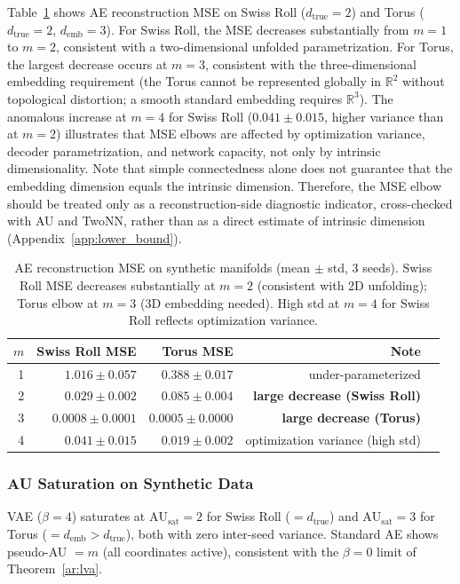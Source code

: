 \documentclass[make,article,submit,pdftex,moreauthors]{Definitions/mdpi}
\newcommand{\dtrue}{d_{\mathrm{true}}}
\newcommand{\AUsat}{\mathrm{AU}_{\mathrm{sat}}}
\newcommand{\demb}{d_{\mathrm{emb}}}
\newcommand{\R}{\mathbb{R}}
\begin{document}
Table~\ref{tab:e1} shows AE reconstruction MSE on Swiss Roll
($\dtrue = 2$) and Torus ($\dtrue = 2$, $\demb = 3$).
For Swiss Roll, the MSE decreases substantially from $m = 1$ to $m = 2$,
consistent with a two-dimensional unfolded parametrization.
For Torus, the largest decrease occurs at $m = 3$, consistent with the
three-dimensional embedding requirement (the Torus cannot be represented
globally in $\R^2$ without topological distortion; a smooth standard
embedding requires $\R^3$).
The anomalous increase at $m = 4$ for Swiss Roll ($0.041 \pm 0.015$,
higher variance than at $m = 2$) illustrates that MSE elbows are affected
by optimization variance, decoder parametrization, and network capacity,
not only by intrinsic dimensionality.
Note that simple connectedness alone does not guarantee that the embedding
dimension equals the intrinsic dimension.
Therefore, the MSE elbow should be treated only as a reconstruction-side
diagnostic indicator, cross-checked with AU and TwoNN, rather than as a
direct estimate of intrinsic dimension (Appendix~\ref{app:lower_bound}).

\begin{table}[H]
\caption{AE reconstruction MSE on synthetic manifolds (mean $\pm$ std,
3 seeds). Swiss Roll MSE decreases substantially at $m = 2$ (consistent
with 2D unfolding); Torus elbow at $m = 3$ (3D embedding needed).
High std at $m = 4$ for Swiss Roll reflects optimization variance.}
\label{tab:e1}
\small
\begin{tabular}{rrrrl}
\toprule
$m$ & \textbf{Swiss Roll MSE} & \textbf{Torus MSE} & Note \\
\midrule
1 & $1.016 \pm 0.057$ & $0.388 \pm 0.017$ & under-parameterized \\
2 & $\mathbf{0.029 \pm 0.002}$ & $0.085 \pm 0.004$ &
  \textbf{large decrease (Swiss Roll)} \\
3 & $0.0008 \pm 0.0001$ & $\mathbf{0.0005 \pm 0.0000}$ &
  \textbf{large decrease (Torus)} \\
4 & $0.041 \pm 0.015$ & $0.019 \pm 0.002$ &
  optimization variance (high std) \\
\bottomrule
\end{tabular}
\end{table}

\subsubsection{AU Saturation on Synthetic Data}

VAE ($\beta = 4$) saturates at $\AUsat = 2$ for Swiss Roll
($= \dtrue$) and $\AUsat = 3$ for Torus ($= \demb > \dtrue$), both with
zero inter-seed variance.
Standard AE shows pseudo-AU $= m$ (all coordinates active), consistent
with the $\beta = 0$ limit of Theorem~\ref{ar:lva}.
\end{document}

